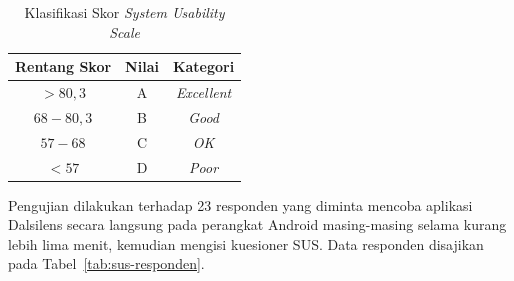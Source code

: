 \begin{table}[H]
  \centering
  \caption{Klasifikasi Skor \textit{System Usability Scale}}
  \label{tab:sus-interpretasi}
  \begin{tabular}{|c|c|c|}
    \hline
    Rentang Skor & Nilai & Kategori \\
    \hline
    $> 80{,}3$ & A & \textit{Excellent} \\
    \hline
    $68 - 80{,}3$ & B & \textit{Good} \\
    \hline
    $57 - 68$ & C & \textit{OK} \\
    \hline
    $< 57$ & D & \textit{Poor} \\
    \hline
  \end{tabular}
\end{table}

Pengujian dilakukan terhadap 23 responden yang diminta mencoba aplikasi Dalsilens secara langsung pada perangkat Android masing-masing selama kurang lebih lima menit, kemudian mengisi kuesioner SUS.
Data responden disajikan pada Tabel~\ref{tab:sus-responden}.

